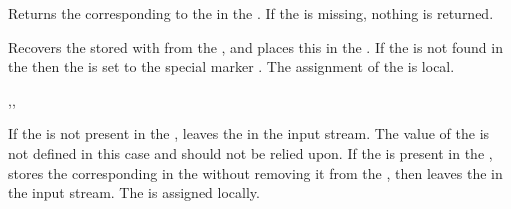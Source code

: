 \documentclass[oneside]{book}
\let\tn=\cs
\begin{document}
\begin{function}{\propVarItem}
\begin{syntax}
  
\end{syntax}
Returns the  corresponding to the  in
the . If the  is missing,
nothing is returned.
\begin{demohigh}
\propSetFromKeyval {}
\tlSet {}
\tlUse \lTmpaTl
\end{demohigh}
\end{function}

\begin{function}{\propGet}
\begin{syntax}
   
\end{syntax}
Recovers the  stored with  from the ,
and places this in the .
If the  is not found in the
 then the  is set
to the special marker .
The assignment of the  is local.
\begin{demohigh}
\propSetFromKeyval {}
\propGet {} \lTmpaTl
\tlUse \lTmpaTl
\end{demohigh}
\end{function}

\begin{function}{\propGetT,\propGetF,\propGetTF}
\begin{syntax}
    
    
     
\end{syntax}
If the  is not present in the , leaves
the  in the input stream.  The value of the
 is not defined in this case and should
not be relied upon.  If the  is present in the
, stores the corresponding  in the
 without removing it from the
, then leaves the  in the input
stream.  The  is assigned locally.
\begin{demohigh}
\propSetFromKeyval {}
\propGetTF {}  {}
\end{demohigh}
\end{function}
\end{document}
